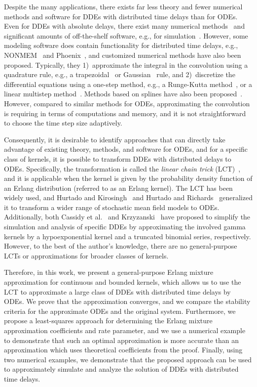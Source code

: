 Despite the many applications, there exists far less theory and fewer numerical methods and software for DDEs with distributed time delays than for ODEs. Even for DDEs with absolute delays, there exist many numerical methods~\cite{Bellen:2000, Polyanin:etal:2023} and significant amounts of off-the-shelf software, e.g., for simulation~\cite{Shampine:Thompson:2001}. However, some modeling software does contain functionality for distributed time delays, e.g., NONMEM~\cite{Yan:etal:2021} and Phoenix~\cite{Hu:etal:2018}, and customized numerical methods have also been proposed. Typically, they 1)~approximate the integral in the convolution using a quadrature rule, e.g., a trapezoidal~\cite{Huang:Vandewalle:2004} or Gaussian~\cite{Torkamani:etal:2013} rule, and 2)~discretize the differential equations using a one-step method, e.g., a Runge-Kutta method~\cite{Zhang:Xiao:2016, Eremin:2019}, or a linear multistep method~\cite{Wang:etal:2018}. Methods based on splines have also been proposed~\cite{Zhou:2016}. However, compared to similar methods for ODEs, approximating the convolution is requiring in terms of computations and memory, and it is not straightforward to choose the time step size adaptively.

Consequently, it is desirable to identify approaches that can directly take advantage of existing theory, methods, and software for ODEs, and for a specific class of kernels, it is possible to transform DDEs with distributed delays to ODEs. Specifically, the transformation is called the \emph{linear chain trick} (LCT)~\cite{MacDonald:1978, Ponosov:etal:2004, Smith:2011}, and it is applicable when the kernel is given by the probability density function of an Erlang distribution (referred to as an Erlang kernel). The LCT has been widely used, and Hurtado and Kirosingh~\cite{Hurtado:Kirosingh:2019} and Hurtado and Richards~\cite{Hurtado:Richards:2020, Hurtado:Richards:2021} generalized it to transform a wider range of stochastic mean field models to ODEs. Additionally, both Cassidy et al.~\cite{Cassidy:etal:2022} and Krzyzanski~\cite{Krzyzanski:2019} have proposed to simplify the simulation and analysis of specific DDEs by approximating the involved gamma kernels by a hypoexponential kernel and a truncated binomial series, respectively.
%
However, to the best of the author's knowledge, there are no general-purpose LCTs or approximations for broader classes of kernels.

Therefore, in this work, we present a general-purpose Erlang mixture approximation for continuous and bounded kernels, which allows us to use the LCT to approximate a large class of DDEs with distributed time delays by ODEs. We prove that the approximation converges, and we compare the stability criteria for the approximate ODEs and the original system. Furthermore, we propose a least-squares approach for determining the Erlang mixture approximation coefficients and rate parameter, and we use a numerical example to demonstrate that such an optimal approximation is more accurate than an approximation which uses theoretical coefficients from the proof. Finally, using two numerical examples, we demonstrate that the proposed approach can be used to approximately simulate and analyze the solution of DDEs with distributed time delays.

